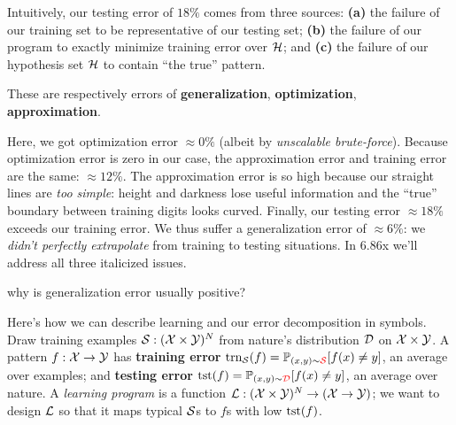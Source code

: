 
        Intuitively, our testing error of $18\%$ comes from three sources:
        \textbf{(a)} the failure of our training set to be representative of our testing set;
        \textbf{(b)} the failure of our program to exactly minimize training error over $\mathcal{H}$; and
        \textbf{(c)} the failure of our hypothesis set $\mathcal{H}$ to contain ``the true'' pattern.

        These are respectively errors of
        \textbf{generalization},
        \textbf{optimization},
        \textbf{approximation}.

        Here, we got optimization error $\approx 0\%$ (albeit by
        \emph{unscalable brute-force}).  Because optimization error is zero in
        our case, the approximation error and training error are the same:
        $\approx12\%$.  The approximation error is so high because our straight
        lines are \emph{too simple}: height and darkness lose useful
        information and the ``true'' boundary between training digits looks
        curved.
        Finally, our testing error $\approx 18\%$ exceeds our training error.
        We thus suffer a generalization error of $\approx 6\%$: we \emph{didn't
        perfectly extrapolate} from training to testing situations.
        In 6.86x we'll address all three italicized issues.

        \noindent
         {why is generalization error usually positive?}


        Here's how we can describe learning and our error decomposition in
        symbols.
        Draw training examples $\mathcal{S} : (\mathcal{X}\times \mathcal{Y})^N$
        from nature's distribution $\mathcal{D}$ on $\mathcal{X}\times \mathcal{Y}$.  A pattern
        $f:\mathcal{X}\to \mathcal{Y}$ has \textbf{training error}
        $
           \Ein(f) = \Pp_{(x,y)\sim \red{\sS}}[f(x)\neq y]
        $, an average over examples; and \textbf{testing error}
        $
           \Eout(f) = \Pp_{(x,y)\sim \red{\dD}}[f(x)\neq y]
        $, an average over nature.  A \emph{learning program} is a function
        $
            \mathcal{L} : (\mathcal{X}\times \mathcal{Y})^N \to (\mathcal{X}\to \mathcal{Y})
        $; we want to design $\mathcal{L}$ so that it maps typical $\mathcal{S}$s to $f$s with
        low $\text{tst}(f)$.\marginnote{%
        }

